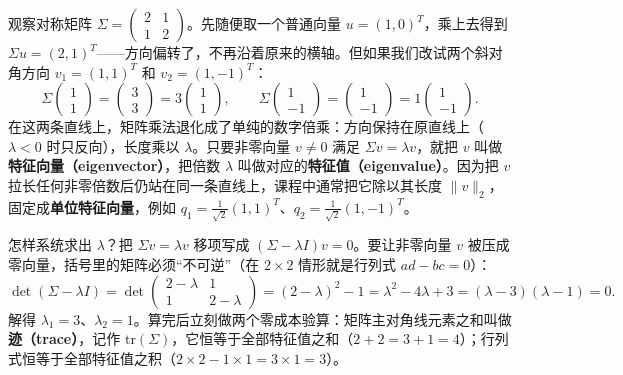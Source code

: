 

观察对称矩阵 \(\Sigma = \begin{pmatrix} 2 & 1 \\ 1 & 2 \end{pmatrix}\)。先随便取一个普通向量 \(u = (1, 0)^T\)，乘上去得到 \(\Sigma u = (2, 1)^T\)——方向偏转了，不再沿着原来的横轴。但如果我们改试两个斜对角方向 \(v_1 = (1, 1)^T\) 和 \(v_2 = (1, -1)^T\)：
\[
\Sigma \begin{pmatrix} 1 \\ 1 \end{pmatrix} = \begin{pmatrix} 3 \\ 3 \end{pmatrix} = 3 \begin{pmatrix} 1 \\ 1 \end{pmatrix}, \qquad
\Sigma \begin{pmatrix} 1 \\ -1 \end{pmatrix} = \begin{pmatrix} 1 \\ -1 \end{pmatrix} = 1 \begin{pmatrix} 1 \\ -1 \end{pmatrix}.
\]
在这两条直线上，矩阵乘法退化成了单纯的数字倍乘：方向保持在原直线上（\(\lambda < 0\) 时只反向），长度乘以 \(\lambda\)。只要非零向量 \(v \neq 0\) 满足 \(\Sigma v = \lambda v\)，就把 \(v\) 叫做\textbf{特征向量（eigenvector）}，把倍数 \(\lambda\) 叫做对应的\textbf{特征值（eigenvalue）}。因为把 \(v\) 拉长任何非零倍数后仍站在同一条直线上，课程中通常把它除以其长度 \(\|v\|_2\)，固定成\textbf{单位特征向量}，例如 \(q_1 = \frac{1}{\sqrt{2}}(1, 1)^T\)、\(q_2 = \frac{1}{\sqrt{2}}(1, -1)^T\)。


怎样系统求出 \(\lambda\)？把 \(\Sigma v = \lambda v\) 移项写成 \((\Sigma - \lambda I)v = 0\)。要让非零向量 \(v\) 被压成零向量，括号里的矩阵必须“不可逆”（在 \(2\times 2\) 情形就是行列式 \(ad - bc = 0\)）：
\[
\det(\Sigma - \lambda I) = \det\begin{pmatrix} 2 - \lambda & 1 \\ 1 & 2 - \lambda \end{pmatrix} = (2 - \lambda)^2 - 1 = \lambda^2 - 4\lambda + 3 = (\lambda - 3)(\lambda - 1) = 0.
\]
解得 \(\lambda_1 = 3\)、\(\lambda_2 = 1\)。算完后立刻做两个零成本验算：矩阵主对角线元素之和叫做\textbf{迹（trace）}，记作 \(\mathrm{tr}(\Sigma)\)，它恒等于全部特征值之和（\(2 + 2 = 3 + 1 = 4\)）；行列式恒等于全部特征值之积（\(2\times 2 - 1\times 1 = 3\times 1 = 3\)）。


